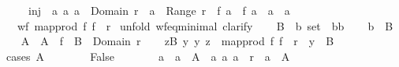 \begin{isabellebody}
\ \ \ \ \ inj{\isacharcolon}{\kern0pt}\ {\isachardoublequoteopen}{\isasymAnd}\ a\ a{\isacharprime}{\kern0pt}{\isachardot}{\kern0pt}\ a\ {\isasymin}\ Domain\ r\ {\isasymLongrightarrow}\ a{\isacharprime}{\kern0pt}\ {\isasymin}\ Range\ r\ {\isasymLongrightarrow}\ f\ a\ {\isacharequal}{\kern0pt}\ f\ a{\isacharprime}{\kern0pt}\ {\isasymLongrightarrow}\ a\ {\isacharequal}{\kern0pt}\ a{\isacharprime}{\kern0pt}{\isachardoublequoteclose}\isanewline
\ \ \ {\isachardoublequoteopen}wf\ {\isacharparenleft}{\kern0pt}map{\isacharunderscore}{\kern0pt}prod\ f\ f\ {\isacharbackquote}{\kern0pt}\ r{\isacharparenright}{\kern0pt}{\isachardoublequoteclose}\isanewline
%
\isadelimproof
%
\endisadelimproof
%
\isatagproof
{}\isamarkupfalse%
\ {\isacharparenleft}{\kern0pt}unfold\ wf{\isacharunderscore}{\kern0pt}eq{\isacharunderscore}{\kern0pt}minimal{\isacharcomma}{\kern0pt}\ clarify{\isacharparenright}{\kern0pt}\isanewline
\ \ \isamarkupfalse%
\ B\ {\isacharcolon}{\kern0pt}{\isacharcolon}{\kern0pt}\ {\isachardoublequoteopen}{\isacharprime}{\kern0pt}b\ set{\isachardoublequoteclose}\ \ b{\isacharcolon}{\kern0pt}{\isacharcolon}{\kern0pt}{\isachardoublequoteopen}{\isacharprime}{\kern0pt}b{\isachardoublequoteclose}\isanewline
\ \ \isamarkupfalse%
\ {\isachardoublequoteopen}b\ {\isasymin}\ B{\isachardoublequoteclose}\isanewline
\ \ \isamarkupfalse%
\ A\ \ {\isachardoublequoteopen}A\ {\isacharequal}{\kern0pt}\ f\ {\isacharminus}{\kern0pt}{\isacharbackquote}{\kern0pt}\ B\ {\isasyminter}\ Domain\ r{\isachardoublequoteclose}\isanewline
\ \ \isamarkupfalse%
\ {\isachardoublequoteopen}{\isasymexists}z{\isasymin}B{\isachardot}{\kern0pt}\ {\isasymforall}y{\isachardot}{\kern0pt}\ {\isacharparenleft}{\kern0pt}y{\isacharcomma}{\kern0pt}\ z{\isacharparenright}{\kern0pt}\ {\isasymin}\ map{\isacharunderscore}{\kern0pt}prod\ f\ f\ {\isacharbackquote}{\kern0pt}\ r\ {\isasymlongrightarrow}\ y\ {\isasymnotin}\ B{\isachardoublequoteclose}\isanewline
\ \ \isamarkupfalse%
\ {\isacharparenleft}{\kern0pt}cases\ {\isachardoublequoteopen}A\ {\isacharequal}{\kern0pt}\ {\isacharbraceleft}{\kern0pt}{\isacharbraceright}{\kern0pt}{\isachardoublequoteclose}{\isacharparenright}{\kern0pt}\isanewline
\ \ \ \ \isamarkupfalse%
\ False\isanewline
\ \ \ \ \isamarkupfalse%
\ \isamarkupfalse%
\ a{}\ \ {\isachardoublequoteopen}a{}\ {\isasymin}\ A{\isachardoublequoteclose}\ \ {\isachardoublequoteopen}{\isasymforall}a{\isachardot}{\kern0pt}\ {\isacharparenleft}{\kern0pt}a{\isacharcomma}{\kern0pt}\ a{}{\isacharparenright}{\kern0pt}\ {\isasymin}\ r\ {\isasymlongrightarrow}\ a\ {\isasymnotin}\ A{\isachardoublequoteclose}\isanewline

\end{isabellebody}

